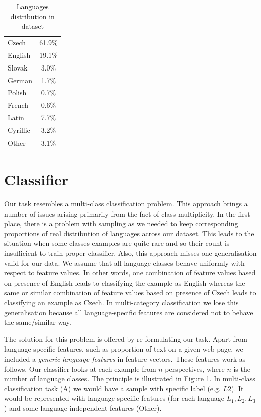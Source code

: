 \documentclass{acm_proc_article-sp}
\begin{document}
  \begin{table}[]
 \centering
 \caption{Languages distribution in dataset} 
 \label{langdist} 
 \vspace{0.5cm}
 \begin{tabular}{l||c}
    Czech & 61.9\% \\
    English & 19.1\% \\
    Slovak & 3.0\% \\
    German & 1.7\% \\
    Polish & 0.7\% \\
    French & 0.6\% \\ \hline
    Latin & 7.7\% \\
    Cyrillic & 3.2\% \\
    Other & 3.1\% \\
 \end{tabular}
 \end{table}


 \section{Classifier}
 \label{sec:classifier}

  Our task resembles a multi-class classification problem. 
  This approach brings a number of issues arising primarily from the fact of class multiplicity. 
  In the first place, there is a problem with sampling as we needed to keep corresponding proportions 
  of real distribution of languages across our dataset. 
  This leads to the situation when some classes examples are quite rare and so their count is insufficient 
  to train proper classifier. Also, this approach misses one generalisation valid for our data.
  We assume that all language classes behave uniformly with respect to feature values. In other words, 
  one combination of feature values based on presence of English leads to classifying the example as English whereas 
  the same or similar combination of feature values based on presence of Czech leads to classifying an example as Czech.
  In multi-category classification we lose this generalisation because all language-specific features are considered
  not to behave the same/similar way.

  The solution for this problem is offered by re-formulating our task.
  Apart from language specific features, such as proportion of text on a given 
  web page, we included a \textit{generic language features} in feature vectors. These features work as follows.
  Our classifier looks at each example from $n$ perspectives, where $n$ is the number of language classes.
  The principle is illustrated in Figure 1. 
  In multi-class classification task (A) we would have a sample with specific label (e.g. $L2$).
  It would be represented with language-specific features (for each language $L_1,L_2,L_3$ ) and some 
  language independent features (Other).
\end{document}
